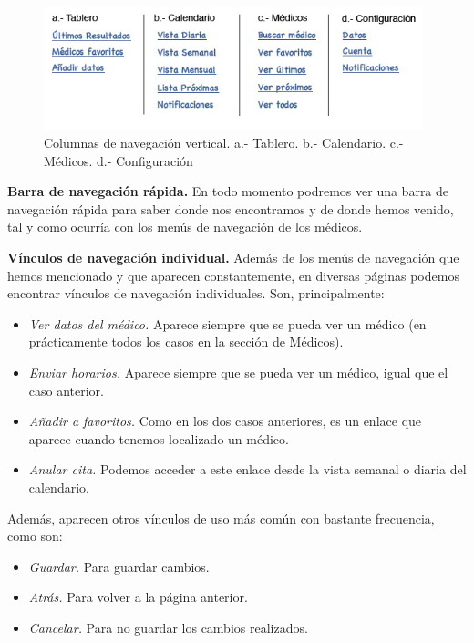 \documentclass[a4paper,oneside,11pt]{book}
\begin{document}
		\begin{figure}[H]
		  \centering
		    \includegraphics[width=11cm]{img/jpg/nav/paciente_lat1.jpg}
		  \caption{Columnas de navegación vertical. a.- Tablero. b.- Calendario. c.- Médicos. d.- Configuración}
		  \label{fig:nav_paciente_lat1}
		\end{figure}
		
		\textbf{Barra de navegación rápida.} En todo momento podremos ver una barra de navegación rápida para saber donde nos encontramos y de donde hemos venido, tal y como ocurría con los menús de navegación de los médicos.
		
		\textbf{Vínculos de navegación individual.} Además de los menús de navegación que hemos mencionado y que aparecen constantemente, en diversas páginas podemos encontrar vínculos de navegación individuales. Son, principalmente:
		\begin{itemize}
			\item \textit{Ver datos del médico.} Aparece siempre que se pueda ver un médico (en prácticamente todos los casos en la sección de Médicos).
			\item \textit{Enviar horarios.} Aparece siempre que se pueda ver un médico, igual que el caso anterior.
			\item \textit{Añadir a favoritos.} Como en los dos casos anteriores, es un enlace que aparece cuando tenemos localizado un médico.
			\item \textit{Anular cita.} Podemos acceder a este enlace desde la vista semanal o diaria del calendario. 
		\end{itemize}
		
		Además, aparecen otros vínculos de uso más común con bastante frecuencia, como son:
		\begin{itemize}
			\item \textit{Guardar.} Para guardar cambios.
			\item \textit{Atrás.} Para volver a la página anterior.
			\item \textit{Cancelar.} Para no guardar los cambios realizados.
		\end{itemize}
		
\end{document}

